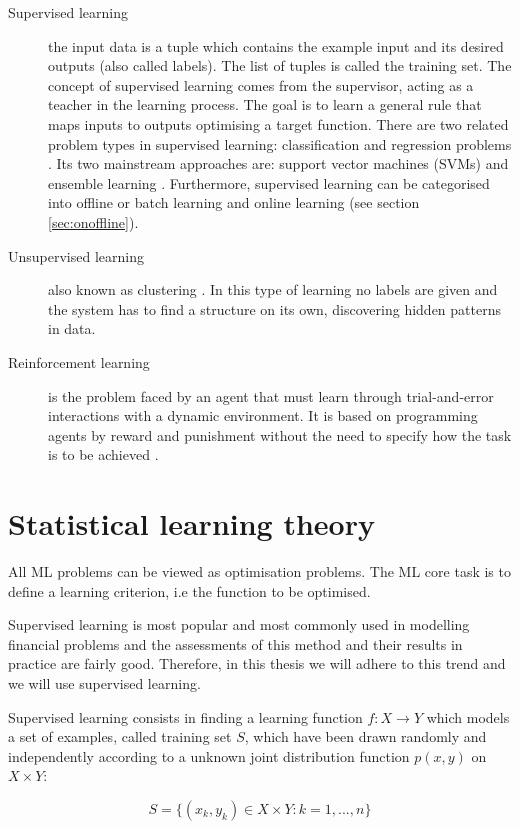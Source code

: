 \begin{description}
\item[Supervised learning]  the input data is a tuple which contains the example input and its desired outputs (also called labels). The list of tuples is called the training set. The concept of supervised learning comes from the supervisor, acting as a teacher in the learning process. The goal is to learn a general rule that maps inputs to outputs optimising a target function. There are two related problem types in supervised learning: classification and regression problems \cite{bishop2006}. Its two mainstream approaches are: support vector machines (SVMs) \cite{vapnik1998} and ensemble learning \cite{breiman1998}. Furthermore, supervised learning can be categorised into offline or batch learning and online learning (see section \ref{sec:onoffline}). 
\item[Unsupervised learning] also known as clustering \cite{ben2005}. In this type of learning no labels are given and the system has to find a structure on its own, discovering hidden patterns in data.
\item[Reinforcement learning] is the problem faced by an agent that must learn 
through trial-and-error interactions with a dynamic environment. It is based on programming agents by reward and punishment without the need to specify how the task is to be achieved \cite{sutton1998}.
\end{description}


\section{Statistical learning theory} \label{sec:mltheory}

All ML problems can be viewed as optimisation problems. The ML core task is to define a learning criterion, i.e the function to be optimised. 

Supervised learning is most popular and most commonly used in modelling financial problems and the assessments of this method and their results in practice are fairly good. Therefore, in this thesis we will adhere to this trend and we will use supervised learning.

Supervised learning consists in finding a learning function $f: X \rightarrow Y$ which models a set of examples, called training set $S$, which have been drawn randomly and independently according to a unknown joint distribution function $p(x,y)$ on $X \times Y$:


$$
S = \{ (x_k,y_k)\in X\times Y : k=1,...,n \}
$$

